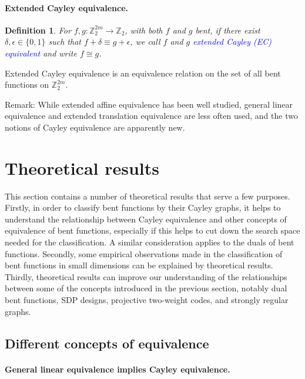 \documentclass[12pt,a4paper]{article}
\newcommand{\mb}[1]{\mathbb{#1}}
\newcommand{\Z}{\mb{Z}}
\newcommand{\To}{\rightarrow}
\newcommand{\Emph}[1]{\emph{\textcolor{blue}{#1}}}
\newtheorem{Definition}{Definition}
\begin{document}
\paragraph*{Extended Cayley equivalence.}
\begin{Definition}
For $f, g : \Z_2^{2m} \To \Z_2$, with both $f$ and $g$ bent,
if there exist $\delta, \epsilon \in \{0,1\}$ such that $f + \delta \equiv g + \epsilon$,
we call $f$ and $g$ \Emph{extended Cayley (EC) equivalent} and write $f \cong g$.
\end{Definition}
Extended Cayley equivalence is an equivalence relation on the set of all bent functions on
$\Z_2^{2m}$.

Remark: While extended affine equivalence has been well studied,
general linear equivalence and extended translation equivalence are less often used,
and the two notions of Cayley equivalence are apparently new.

\section{Theoretical results}
\label{sec-Results}

This section contains a number of theoretical results that serve a few purposes.
Firstly, in order to classify bent functions by their Cayley graphs,
it helps to understand the relationship between Cayley equivalence and other concepts of equivalence
of bent functions, especially if this helps to cut down the search space needed for the
classification.
A similar consideration applies to the duals of bent functions.
Secondly, some empirical observations made in the classification of bent functions in small
dimensions can be explained by theoretical results.
Thirdly, theoretical results can improve our understanding of the relationships between
some of the concepts introduced in the previous section, notably dual bent functions, SDP designs,
projective two-weight codes, and strongly regular graphs.

\subsection{Different concepts of equivalence}

\paragraph*{General linear equivalence implies Cayley equivalence.}
\end{document}
